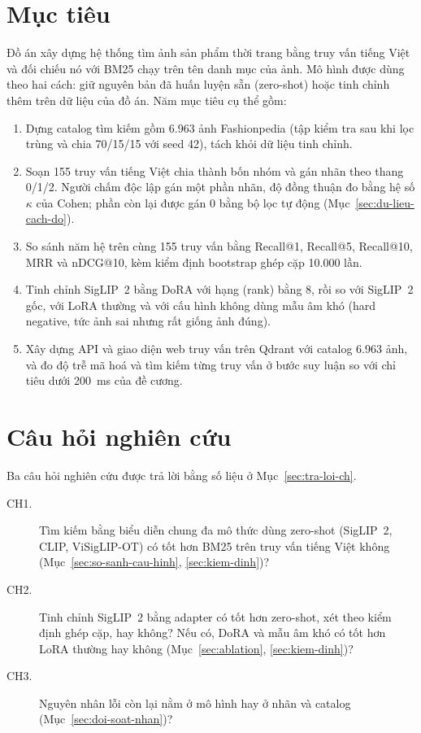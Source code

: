 \section{Mục tiêu}
\label{sec:muc-tieu}

Đồ án xây dựng hệ thống tìm ảnh sản phẩm thời trang bằng truy vấn tiếng Việt và đối chiếu nó với BM25 chạy trên tên danh mục của ảnh. Mô hình được dùng theo hai cách: giữ nguyên bản đã huấn luyện sẵn (zero-shot) hoặc tinh chỉnh thêm trên dữ liệu của đồ án. Năm mục tiêu cụ thể gồm:

\begin{enumerate}
    \item Dựng catalog tìm kiếm gồm 6.963 ảnh Fashionpedia (tập kiểm tra sau khi lọc trùng và chia 70/15/15 với seed 42), tách khỏi dữ liệu tinh chỉnh.
    \item Soạn 155 truy vấn tiếng Việt chia thành bốn nhóm và gán nhãn theo thang 0/1/2. Người chấm độc lập gán một phần nhãn, độ đồng thuận đo bằng hệ số $\kappa$ của Cohen; phần còn lại được gán 0 bằng bộ lọc tự động (Mục~\ref{sec:du-lieu-cach-do}).
    \item So sánh năm hệ trên cùng 155 truy vấn bằng Recall@1, Recall@5, Recall@10, MRR và nDCG@10, kèm kiểm định bootstrap ghép cặp 10.000 lần.
    \item Tinh chỉnh SigLIP~2 bằng DoRA với hạng (rank) bằng 8, rồi so với SigLIP~2 gốc, với LoRA thường và với cấu hình không dùng mẫu âm khó (hard negative, tức ảnh sai nhưng rất giống ảnh đúng).
    \item Xây dựng API và giao diện web truy vấn trên Qdrant với catalog 6.963 ảnh, và đo độ trễ mã hoá và tìm kiếm từng truy vấn ở bước suy luận so với chỉ tiêu dưới 200~ms của đề cương.
\end{enumerate}

\section{Câu hỏi nghiên cứu}
\label{sec:cau-hoi-nghien-cuu}

Ba câu hỏi nghiên cứu được trả lời bằng số liệu ở Mục~\ref{sec:tra-loi-ch}.

\begin{description}
    \item[CH1.] Tìm kiếm bằng biểu diễn chung đa mô thức dùng zero-shot (SigLIP~2, CLIP, ViSigLIP-OT) có tốt hơn BM25 trên truy vấn tiếng Việt không (Mục~\ref{sec:so-sanh-cau-hinh}, \ref{sec:kiem-dinh})?
    \item[CH2.] Tinh chỉnh SigLIP~2 bằng adapter có tốt hơn zero-shot, xét theo kiểm định ghép cặp, hay không? Nếu có, DoRA và mẫu âm khó có tốt hơn LoRA thường hay không (Mục~\ref{sec:ablation}, \ref{sec:kiem-dinh})?
    \item[CH3.] Nguyên nhân lỗi còn lại nằm ở mô hình hay ở nhãn và catalog (Mục~\ref{sec:doi-soat-nhan})?
\end{description}

